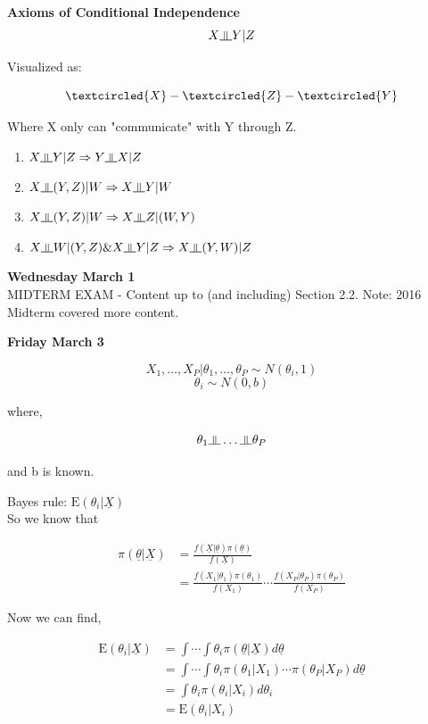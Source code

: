\documentclass[11pt,fleqn]{book} %
\newcommand{\indep}{\rotatebox[origin=c]{90}{$\models$}}
\newcommand{\E}{\mathrm{E}}
\begin{document}
\textbf{Axioms of Conditional Independence}\\

		$$X \indep Y | Z $$

	Visualized as:

		$$\textcircled{X} - \textcircled{Z} - \textcircled{Y}$$

 Where X only can "communicate" with Y through Z. 

 \begin{enumerate}
 	\item $X \indep Y | Z \Rightarrow Y \indep X | Z$
 	\item $X \indep (Y, Z) |W \Rightarrow X\indep Y | W$ 
 	\item $X \indep (Y, Z) |W \Rightarrow X \indep Z | (W, Y)$
 	\item $X \indep W | (Y, Z) \& X \indep Y|Z \Rightarrow X \indep (Y, W) |Z$
 \end{enumerate}

\textbf{Wednesday March 1}\\

MIDTERM EXAM - Content up to (and including) Section 2.2. Note: 2016 Midterm covered more content. 

 \textbf{Friday March 3}\\

\begin{example}
	
	$$X_1, \dots, X_P |\theta_1, \dots, \theta_P \sim N(\theta_i, 1)$$
	$$\theta_i \sim N(0, b) $$

where, 

		$$\theta_1 \indep \dots \indep \theta_P $$

and b is known. 

Bayes rule: $\E (\theta_i| \underline{X})$\\

So we know that 

		\begin{align*}
		\pi(\underline{\theta}|\underline{X}) &= \frac{f(\underline{X}|\underline{\theta}) \pi(\underline{\theta})}{f(\underline{X})}	\\
			&= \frac{f(X_1|\theta_1) \pi(\theta_1)}{f(X_1)} \cdots \frac{f(X_P|\theta_P) \pi(\theta_P)}{f(X_P)}
		\end{align*}		
\end{example}

Now we can find, 

		\begin{align*}
			\E (\theta_i|\underline{X}) &= \int \cdots \int \theta_i \pi(\underline{\theta}|\underline{X}) d\underline{\theta}\\
				&=\int \cdots \int \theta_i \pi(\theta_1|X_1) \cdots \pi(\theta_P|X_P) d\underline{\theta}\\
				&= \int \theta_i \pi(\theta_i|X_i) d\theta_i\\
				&= \E (\theta_i|X_i)
		\end{align*}
\end{document}
